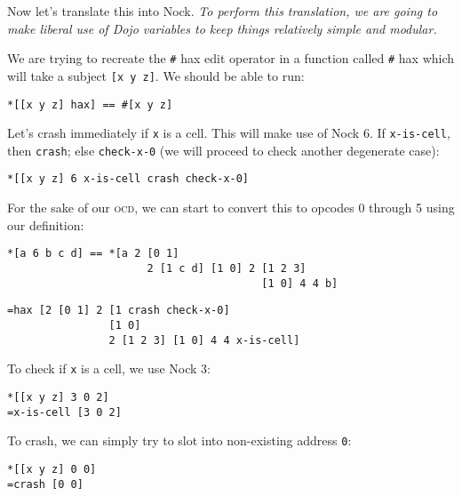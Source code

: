 \documentclass[twoside]{article}
\begin{document}
Now let's translate this into Nock.  \emph{To perform this translation, we are going to make liberal use of Dojo variables to keep things relatively simple and modular.}

We are trying to recreate the \lstinline[style=inlinecode]{#} hax edit operator in a function called \lstinline[style=inlinecode]{#} hax which will take a subject \lstinline[style=inlinecode]{[x y z]}.  We should be able to run:

\begin{lstlisting}[style=listingblock]
*[[x y z] hax] == #[x y z]
\end{lstlisting}

\noindent
Let's crash immediately if \lstinline[style=inlinecode]{x} is a cell. This will make use of Nock 6. If \lstinline[style=inlinecode]{x-is-cell}, then \lstinline[style=inlinecode]{crash}; else \lstinline[style=inlinecode]{check-x-0} (we will proceed to check another degenerate case):

\begin{lstlisting}[style=listingblock]
*[[x y z] 6 x-is-cell crash check-x-0]
\end{lstlisting}

\noindent
For the sake of our \textsc{ocd}, we can start to convert this to opcodes 0 through 5 using our definition:

\begin{lstlisting}[style=listingcode]
*[a 6 b c d] == *[a 2 [0 1]
                      2 [1 c d] [1 0] 2 [1 2 3]
                                        [1 0] 4 4 b]
\end{lstlisting}

\begin{lstlisting}[style=listingblock]
=hax [2 [0 1] 2 [1 crash check-x-0]
                [1 0]
                2 [1 2 3] [1 0] 4 4 x-is-cell]
\end{lstlisting}

\noindent
To check if \lstinline[style=inlinecode]{x} is a cell, we use Nock 3:

\begin{lstlisting}[style=listingblock]
*[[x y z] 3 0 2]
=x-is-cell [3 0 2]
\end{lstlisting}

\noindent
To crash, we can simply try to slot into non-existing address \lstinline[style=inlinecode]{0}:

\begin{lstlisting}[style=listingblock]
*[[x y z] 0 0]
=crash [0 0]
\end{lstlisting}
\end{document}
